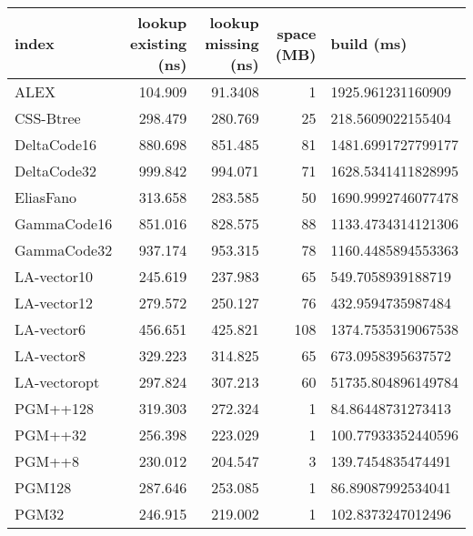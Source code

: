 \begin{tabular}{lrrrl}
\hline
 index             &   lookup existing (ns) &   lookup missing (ns) &   space (MB) & build (ms)         \\
\hline
 ALEX              &               104.909  &               91.3408 &            1 & 1925.961231160909  \\
 CSS-Btree         &               298.479  &              280.769  &           25 & 218.5609022155404  \\
 DeltaCode16       &               880.698  &              851.485  &           81 & 1481.6991727799177 \\
 DeltaCode32       &               999.842  &              994.071  &           71 & 1628.5341411828995 \\
 EliasFano         &               313.658  &              283.585  &           50 & 1690.9992746077478 \\
 GammaCode16       &               851.016  &              828.575  &           88 & 1133.4734314121306 \\
 GammaCode32       &               937.174  &              953.315  &           78 & 1160.4485894553363 \\
 LA-vector10       &               245.619  &              237.983  &           65 & 549.7058939188719  \\
 LA-vector12       &               279.572  &              250.127  &           76 & 432.9594735987484  \\
 LA-vector6        &               456.651  &              425.821  &          108 & 1374.7535319067538 \\
 LA-vector8        &               329.223  &              314.825  &           65 & 673.0958395637572  \\
 LA-vectoropt      &               297.824  &              307.213  &           60 & 51735.804896149784 \\
 PGM++128          &               319.303  &              272.324  &            1 & 84.86448731273413  \\
 PGM++32           &               256.398  &              223.029  &            1 & 100.77933352440596 \\
 PGM++8            &               230.012  &              204.547  &            3 & 139.7454835474491  \\
 PGM128            &               287.646  &              253.085  &            1 & 86.89087992534041  \\
 PGM32             &               246.915  &              219.002  &            1 & 102.8373247012496  \\

\end{tabular}

